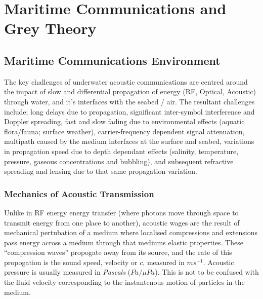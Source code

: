  \def\ChapterTitle{Maritime Communications and Grey Theory}
 
 \ifx\ifthesis\undefined
 
 \else
 \chapter{\ChapterTitle}
 \label{Chapter\thechapter}
 \fi
 
 
 \section{Maritime Communications Environment}\label{sec:trust_in_marine}
 
 The key challenges of underwater acoustic communications are centred around the impact of slow and differential propagation of energy (RF, Optical, Acoustic) through water, and it's interfaces with the seabed / air.
 The resultant challenges include; long delays due to propagation, significant inter-symbol interference and Doppler spreading, fast and slow fading due to environmental effects (aquatic flora/fauna; surface weather), carrier-frequency dependent signal attenuation, multipath caused by the medium interfaces at the surface and seabed, variations in propagation speed due to depth dependant effects (salinity, temperature, pressure, gaseous concentrations and bubbling), and subsequent refractive spreading and lensing due to that same propagation variation\cite{Partan2006}.
 
 \subsection{Mechanics of Acoustic Transmission}

 Unlike in RF energy energy transfer (where photons move through space to transmit energy from one place to another), acoustic wages are the result of mechanical pertubation of a medium where localised compressions and extensions pass energy across a medium through that mediums elastic properties.
 These ``compression waves'' propogate away from its source, and the rate of this propogation is the sound speed, velocity or $c$, measured in $ms^{-1}$.
 Acoustic pressure is usually measured in \emph{Pascals} ($Pa/\mu Pa$). 
 This is not to be confused with the fluid velocity corresponding to the instantenous motion of particles in the medium.

